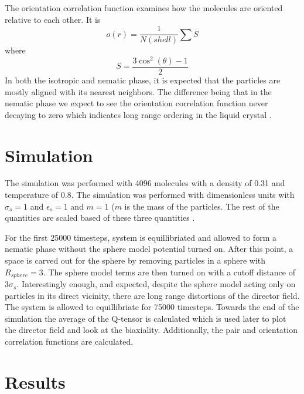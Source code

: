 \documentclass[preprint, aps]{revtex4-1}
\begin{document}
The orientation correlation function examines how the molecules are oriented
relative to each other. It is
	\begin{equation}
		o(r) = \frac{1}{N(shell)}\sum S
	\end{equation}
where
	\begin{equation}
		S = \frac{3\cos^2(\theta)-1}{2}
	\end{equation}
In both the isotropic and nematic phase, it is expected that the particles are
mostly aligned with its nearest neighbors. The difference being that in the
nematic phase we expect to see the orientation correlation function never
decaying to zero which indicates long range ordering in the liquid crystal 
\cite{frenkel01}.
		
\section*{Simulation}
The simulation was performed with 4096 molecules with a density of 0.31 and
temperature of 0.8. The simulation was performed with
dimensionless units with $\sigma_s=1$ and $\epsilon_s=1$ and $m=1$ ($m$ is the
mass of the particles. The rest of the quantities are scaled based of these
three quantities \cite{frenkel01}.

For the first 25000 timesteps, system is equillibriated and allowed to form a
nematic phase without the sphere model potential turned on. After this point, a
space is carved out for the sphere by removing particles in a sphere with
$R_{sphere}=3$. The sphere model terms are then turned on with a cutoff distance
of $3\sigma_s$. Interestingly enough, and expected, despite the sphere model
acting only on particles in its direct vicinity, there are long range
distortions of the director field. The system is allowed to equillibriate for
75000 timesteps. Towards the end of the simulation the average of the Q-tensor
is calculated which is used later to plot the director field and look at the
biaxiality. Additionally, the pair and orientation correlation functions are
calculated.

\section*{Results}
\end{document}
